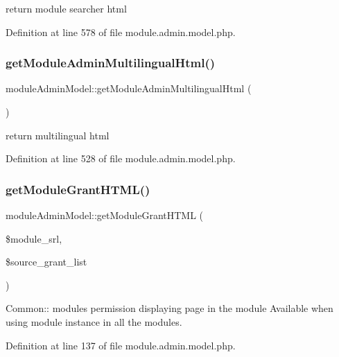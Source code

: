 return module searcher html 

Definition at line 578 of file module.\+admin.\+model.\+php.

\mbox{\label{classmoduleAdminModel_a51568f16c761da74a811fe599970ea0f}} 
\subsubsection{\texorpdfstring{get\+Module\+Admin\+Multilingual\+Html()}{getModuleAdminMultilingualHtml()}}
{\footnotesize\ttfamily module\+Admin\+Model\+::get\+Module\+Admin\+Multilingual\+Html (\begin{DoxyParamCaption}{ }\end{DoxyParamCaption})}

return multilingual html 

Definition at line 528 of file module.\+admin.\+model.\+php.

\mbox{\label{classmoduleAdminModel_a0ab602897fb53096f7b232338c533839}} 
\subsubsection{\texorpdfstring{get\+Module\+Grant\+H\+T\+M\+L()}{getModuleGrantHTML()}}
{\footnotesize\ttfamily module\+Admin\+Model\+::get\+Module\+Grant\+H\+T\+ML (\begin{DoxyParamCaption}\item[{}]{\$module\+\_\+srl,  }\item[{}]{\$source\+\_\+grant\+\_\+list }\end{DoxyParamCaption})}



Common\+:\+: module\textquotesingle{}s permission displaying page in the module Available when using module instance in all the modules. 



Definition at line 137 of file module.\+admin.\+model.\+php.

